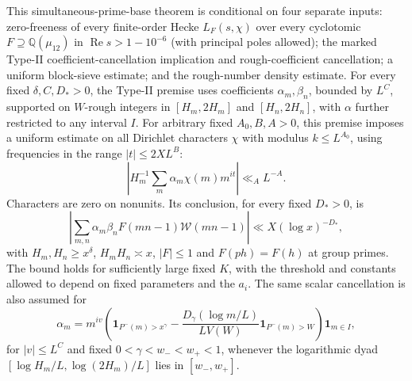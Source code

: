 \documentclass[11pt]{article}
\begin{document}
This simultaneous-prime-base theorem is conditional on four separate inputs: zero-freeness of every finite-order Hecke $L_F(s,\chi)$ over every cyclotomic $F\supseteq\mathbb Q(\mu_{12})$ in $\operatorname{Re}s>1-10^{-6}$ (with principal poles allowed); the marked Type-II coefficient-cancellation implication and rough-coefficient cancellation; a uniform block-sieve estimate; and the rough-number density estimate. For every fixed $\delta,C,D_*>0$, the Type-II premise uses coefficients $\alpha_m,\beta_n$, bounded by $L^C$, supported on $W$-rough integers in $[H_m,2H_m]$ and $[H_n,2H_n]$, with $\alpha$ further restricted to any interval $I$. For arbitrary fixed $A_0,B,A>0$, this premise imposes a uniform estimate on all Dirichlet characters $\chi$ with modulus $k\le L^{A_0}$, using frequencies in the range $|t|\le2XL^B$:
\[
 \left|H_m^{-1}\sum_m\alpha_m\chi(m)m^{it}\right|\ll_A L^{-A}.
\]
Characters are zero on nonunits. Its conclusion, for every fixed $D_*>0$, is
\[
 |\sum_{m,n}\alpha_m\beta_nF(mn-1)\mathcal W(mn-1)|\ll X(\log x)^{-D_*},
\]
with $H_m,H_n\ge x^{\delta}$, $H_mH_n\asymp x$, $|F|\le1$ and $F(ph)=F(h)$ at group primes. The bound holds for sufficiently large fixed $K$, with the threshold and constants allowed to depend on fixed parameters and the $a_i$. The same scalar cancellation is also assumed for
\[
 \alpha_m=m^{iv}\left(\mathbf1_{P^-(m)>x^{\gamma}}
 -\frac{D_{\gamma}(\log m/L)}{LV(W)}\mathbf1_{P^-(m)>W}\right)\mathbf1_{m\in I},
\]
for $|v|\le L^C$ and fixed $0<\gamma<w_-<w_+<1$, whenever the logarithmic dyad $[\log H_m/L,\log(2H_m)/L]$ lies in $[w_-,w_+]$.
\end{document}
